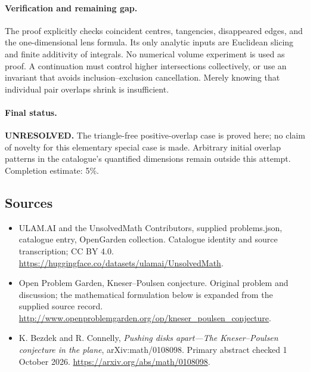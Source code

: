 \documentclass[11pt,a4paper]{article}
\begin{document}
\paragraph{Verification and remaining gap.}
The proof explicitly checks coincident centres, tangencies, disappeared edges,
and the one-dimensional lens formula. Its only analytic inputs are Euclidean
slicing and finite additivity of integrals. No numerical volume experiment is
used as proof. A continuation must control higher intersections collectively,
or use an invariant that avoids inclusion--exclusion cancellation. Merely
knowing that individual pair overlaps shrink is insufficient.

\paragraph{Final status.}
\textbf{UNRESOLVED.} The triangle-free positive-overlap case is proved here;
no claim of novelty for this elementary special case is made. Arbitrary
initial overlap patterns in the catalogue's quantified dimensions remain
outside this attempt. Completion estimate: 5\%.

\subsection{Sources}
\begin{itemize}
\item[S1] ULAM.AI and the UnsolvedMath Contributors, supplied problems.json, catalogue entry, OpenGarden collection. Catalogue identity and source transcription; CC BY 4.0.
\url{https://huggingface.co/datasets/ulamai/UnsolvedMath}.
\item[S2] Open Problem Garden, Kneser–Poulsen conjecture. Original problem and discussion; the mathematical formulation below is expanded from the supplied source record.
\url{http://www.openproblemgarden.org/op/kneser_poulsen_conjecture}.
\item[A1] K. Bezdek and R. Connelly, \emph{Pushing disks apart---The Kneser--Poulsen conjecture in the plane}, arXiv:math/0108098. Primary abstract checked 1 October 2026. \url{https://arxiv.org/abs/math/0108098}.
\end{itemize}
\end{document}
